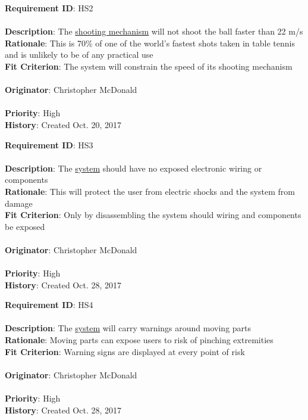 \documentclass[11pt]{article}
\begin{document}
\begin{framed}
	\noindent\textbf{Requirement ID}: HS2 \hfill\\\\
	\noindent\textbf{Description}: The \hyperref[sec:definitions]{shooting mechanism} will not shoot the ball faster than 22 m/s \\
	\textbf{Rationale}: This is 70\% of one of the world's fastest shots taken in table tennis and is unlikely to be of any practical use\\
	\textbf{Fit Criterion}: The system will constrain the speed of its shooting mechanism \\\\
	\textbf{Originator}: Christopher McDonald \\\\
	\textbf{Priority}: High \hfill \\
	\noindent\textbf{History}: Created Oct. 20, 2017
\end{framed}

\begin{framed}
	\noindent\textbf{Requirement ID}: HS3 \hfill\\\\
	\noindent\textbf{Description}: The \hyperref[sec:definitions]{system} should have no exposed electronic wiring or components \\
	\textbf{Rationale}: This will protect the user from electric shocks and the system from damage \\
	\textbf{Fit Criterion}: Only by disassembling the system should wiring and components be exposed \\\\
	\textbf{Originator}: Christopher McDonald \\\\
	\textbf{Priority}: High \hfill \\
	\noindent\textbf{History}: Created Oct. 28, 2017
\end{framed}

\begin{framed}
	\noindent\textbf{Requirement ID}: HS4 \hfill\\\\
	\noindent\textbf{Description}: The \hyperref[sec:definitions]{system} will carry warnings around moving parts  \\
	\textbf{Rationale}: Moving parts can expose users to risk of pinching extremities \\
	\textbf{Fit Criterion}: Warning signs are displayed at every point of risk \\\\
	\textbf{Originator}: Christopher McDonald \\\\
	\textbf{Priority}: High \hfill \\
	\noindent\textbf{History}: Created Oct. 28, 2017
\end{framed}
\end{document}
